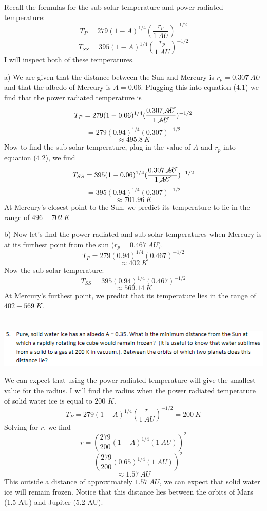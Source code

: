 \documentclass{article}
\begin{document}
Recall the formulas for the sub-solar temperature and power radiated temperature:
\begin{equation}
    T_P = 279(1-A)^{1/4}(\frac{r_p}{1 \:AU})^{-1/2}
\end{equation}
\begin{equation}
    T_{SS} = 395(1-A)^{1/4}(\frac{r_p}{1 \:AU})^{-1/2}
\end{equation}
I will inspect both of these temperatures.

a) We are given that the distance between the Sun and Mercury is $r_p = 0.307 \: AU$ and that the albedo of Mercury is $A = 0.06$. Plugging this into equation (4.1) we find that the power radiated temperature is
\[T_P = 279(1-0.06)^{1/4}(\frac{0.307 \: \cancel{AU}}{1 \: \cancel{AU}})^{-1/2}\]
\[ = 279(0.94)^{1/4}(0.307)^{-1/2}\]
\[\approx 495.8 \: K\]
Now to find the sub-solar temperature, plug in the value of $A$ and $r_p$ into equation (4.2), we find
\[T_{SS} = 395(1-0.06)^{1/4}(\frac{0.307 \: \cancel{AU}}{1 \: \cancel{AU}})^{-1/2}\]
\[ = 395(0.94)^{1/4}(0.307)^{-1/2}\]
\[ \approx 701.96 \: K\]
At Mercury's closest point to the Sun, we predict its temperature to lie in the range of $496 - 702 \:K$

b) Now let's find the power radiated and sub-solar temperatures when Mercury is at its furthest point from the sun ($r_p = 0.467 \: AU$). 
\[T_P = 279(0.94)^{1/4}(0.467)^{-1/2}\]
\[ \approx 402 \: K\]
Now the sub-solar temperature:
\[T_{SS} = 395(0.94)^{1/4}(0.467)^{-1/2}\]
\[\approx 569.14 \: K\]
At Mercury's furthest point, we predict that its temperature lies in the range of $ 402 - 569 \:K$.

\section{}
\includegraphics[scale = 0.8]{probset3num5.PNG}

We can expect that using the power radiated temperature will give the smallest value for the radius. I will find the radius when the power radiated temperature of solid water ice is equal to 200 $K$. 
\[T_{P} = 279(1-A)^{1/4}(\frac{r}{1 \:AU})^{-1/2} = 200 \:K\]
Solving for $r$, we find
\[r = (\frac{279}{200}(1-A)^{1/4}( 1 \:AU))^2\]
\[ = (\frac{279}{200}(0.65)^{1/4}(1 \:AU))^2\]
\[ \approx 1.57 \:AU\]
This outside a distance of approximately $1.57 \: AU$, we can expect that solid water ice will remain frozen. Notice that this distance lies between the orbits of Mars (1.5 AU) and Jupiter (5.2 AU).
\end{document}
